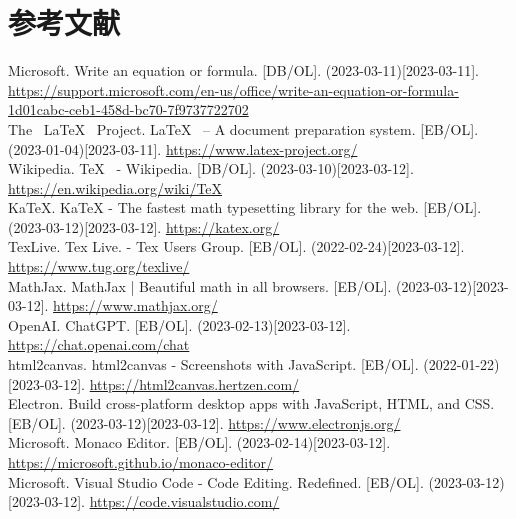 \section*{参考文献}
{}
Microsoft. Write an equation or formula. [DB/OL]. (2023-03-11)[2023-03-11].  \url{https://support.microsoft.com/en-us/office/write-an-equation-or-formula-1d01cabc-ceb1-458d-bc70-7f9737722702}
\\
The \,
\LaTeX
\, Project.
\LaTeX
\, – A document preparation system. [EB/OL]. (2023-01-04)[2023-03-11].  \url{https://www.latex-project.org/}
\\
Wikipedia.
\TeX
\,
- Wikipedia. [DB/OL]. (2023-03-10)[2023-03-12].  \url{https://en.wikipedia.org/wiki/TeX}
\\
KaTeX. KaTeX - The fastest math typesetting library for the web. [EB/OL]. (2023-03-12)[2023-03-12].  \url{https://katex.org/}
\\
TexLive. Tex Live. - Tex Users Group. [EB/OL]. (2022-02-24)[2023-03-12].  \url{https://www.tug.org/texlive/}
\\
MathJax. MathJax | Beautiful math in all browsers. [EB/OL]. (2023-03-12)[2023-03-12].  \url{https://www.mathjax.org/}
\\
OpenAI. ChatGPT. [EB/OL]. (2023-02-13)[2023-03-12].  \url{https://chat.openai.com/chat}
\\
html2canvas. html2canvas - Screenshots with JavaScript. [EB/OL]. (2022-01-22)[2023-03-12]. \url{https://html2canvas.hertzen.com/}
\\
Electron. Build cross-platform desktop apps with JavaScript, HTML, and CSS. [EB/OL].  (2023-03-12)[2023-03-12].  \url{https://www.electronjs.org/}
\\
Microsoft. Monaco Editor. [EB/OL]. (2023-02-14)[2023-03-12]. \url{https://microsoft.github.io/monaco-editor/}
\\
Microsoft. Visual Studio Code - Code Editing. Redefined. [EB/OL]. (2023-03-12)[2023-03-12]. \url{https://code.visualstudio.com/}